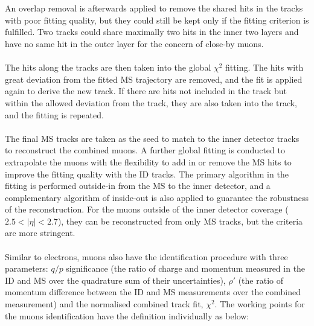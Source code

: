 \\
\\An overlap removal is afterwards applied to remove the shared hits in the tracks with poor fitting quality, but they could still be kept only if the fitting criterion is fulfilled. Two tracks could share maximally two hits in the inner two layers and have no same hit in the outer layer for the concern of close-by muons. 
\\
\\The hits along the tracks are then taken into the global $\chi^{2}$ fitting. The hits with great deviation from the fitted MS trajectory are removed, and the fit is applied again to derive the new track. If there are hits not included in the track but within the allowed deviation from the track, they are also taken into the track, and the fitting is repeated. 
\\
\\The final MS tracks are taken as the seed to match to the inner detector tracks to reconstruct the combined muons. A further global fitting is conducted to extrapolate the muons with the flexibility to add in or remove the MS hits to improve the fitting quality with the ID tracks. The primary algorithm in the fitting is performed outside-in from the MS to the inner detector, and a complementary algorithm of inside-out is also applied to guarantee the robustness of the reconstruction. For the muons outside of the inner detector coverage ($2.5<|\eta|<2.7$), they can be reconstructed from only MS tracks, but the criteria are more stringent. 
\\
\\Similar to electrons, muons also have the identification procedure with three parameters: $q/p$ significance (the ratio of charge and momentum measured in the ID and MS over the quadrature sum of their uncertainties), $\rho'$ (the ratio of momentum difference between the ID and MS measurements over the combined measurement) and the normalised combined track fit, $\chi^2$. The working points for the muons identification have the definition individually as below:
